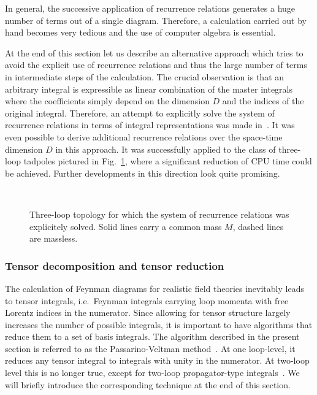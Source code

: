 In general, the successive application of recurrence relations generates
a huge number of terms out of a single diagram.  Therefore, a calculation
carried out by hand becomes very tedious and the use of computer algebra
is essential.


At the end of this section let us describe an alternative approach which
tries to avoid the explicit use of recurrence relations and thus the
large number of terms in intermediate steps of the calculation.  The
crucial observation is that an arbitrary integral is expressible as
linear combination of the master integrals where the coefficients simply
depend on the dimension $D$ and the indices of the original integral.
Therefore, an attempt to explicitly solve the system of recurrence
relations in terms of integral representations was made
in~\cite{Bai96,BaiSte98}.  It was even possible to derive additional
recurrence relations over the space-time dimension $D$ in this approach.
It was successfully applied to the class of three-loop tadpoles pictured
in Fig.~\ref{fig3ltad}, where a significant reduction of CPU time could
be achieved.  Further developments in this direction look quite
promising.
%
\begin{figure}[h]
  \begin{center}
    \leavevmode
    \epsfxsize=2.5cm
    \\
    \parbox{\captionwidth}{
      \caption[]{\label{fig3ltad}\sloppy
        Three-loop topology for which the system of recurrence relations
        was explicitely solved. Solid lines carry a common mass $M$, dashed
        lines are massless.
        }
      }
  \end{center}
\end{figure}


\subsubsection{Tensor decomposition and tensor reduction\label{sectensdec}}
%
The calculation of Feynman diagrams for realistic field theories
inevitably leads to tensor integrals, i.e.\ Feynman integrals carrying
loop momenta with free Lorentz indices in the numerator. Since allowing
for tensor structure largely increases the number of possible integrals,
it is important to have algorithms that reduce them to a set of basis
integrals. The algorithm described in the present section is referred to
as the Passarino-Veltman method~\cite{PasVel79}.  At one loop-level, it
reduces any tensor integral to integrals with unity in the numerator.
At two-loop level this is no longer true, except for two-loop
propagator-type integrals~\cite{WeiSchBoe94}.  We will briefly introduce
the corresponding technique at the end of this section.

